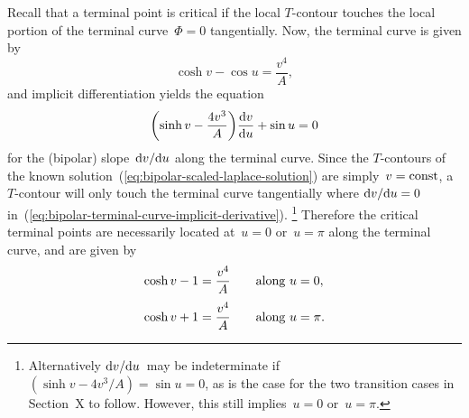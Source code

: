 Recall that a terminal point is critical
if the local $T$-contour touches
the local portion of the terminal curve~$\Phi = 0$ tangentially.
Now, the terminal curve is given by
\begin{equation}
  \cosh v - \cos u = \frac{v^4}{A},
  \label{eq:bipolar-terminal-curve}
\end{equation}
and implicit differentiation yields the equation
\begin{equation}
  \roundbr*{\sinh v - \frac{4 v^3}{A}} \tder{v}{u} + \sin u = 0
  \label{eq:bipolar-terminal-curve-implicit-derivative}
\end{equation}
for the (bipolar) slope~$\mathop{}\!\mathrm{d} v / {\mathop{}\!\mathrm{d} u}$
along the terminal curve.
Since the $T$-contours
of the known solution~(\ref{eq:bipolar-scaled-laplace-solution})
are simply~$v = \mathrm{const}$,
a $T$-contour will only touch the terminal curve tangentially
where $\mathop{}\!\mathrm{d} v / {\mathop{}\!\mathrm{d} u} = 0$
in~(\ref{eq:bipolar-terminal-curve-implicit-derivative}).%
\footnote{
  Alternatively $\mathop{}\!\mathrm{d} v / {\mathop{}\!\mathrm{d} u}$~may be indeterminate
  if~$(\sinh v - 4 v^3 / A) = \sin u = 0$,
  as is the case for the two transition cases
  in Section~X to follow. %
  However, this still implies~$u = 0$ or~$u = \pi$.
}
Therefore the critical terminal points are necessarily located
at~$u = 0$ or~$u = \pi$ along the terminal curve,
and are given by
\begin{align}
  \cosh v - 1 &= \frac{v^4}{A} \eqnspace \text{along~$u = 0$},
  \label{eq:bipolar-critical-terminal-point-0}
    \\[\tallspace]
  \cosh v + 1 &= \frac{v^4}{A} \eqnspace \text{along~$u = \pi$}.
  \label{eq:bipolar-critical-terminal-point-pi}
\end{align}
